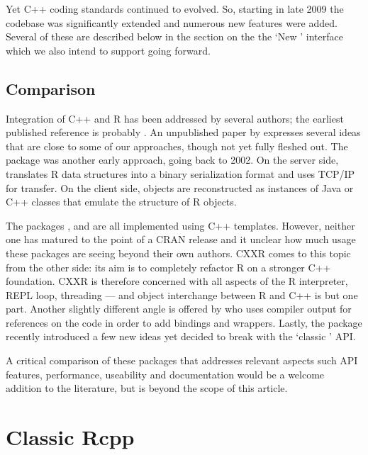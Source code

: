 Yet C++ coding standards continued to evolved. So, starting in late 2009 the
codebase was significantly extended and numerous new features were added.
Several of these are described below in the section on the the `New
' interface which we also intend to support going forward.

\subsection{Comparison}

Integration of C++ and R has been addressed by several authors; the earliest
published reference is probably \cite{batesdebroy01:cppclasses}.
An unpublished paper by \cite{javagailemanly07:r_cpp} expresses several ideas
that are close to some of our approaches, though not yet fully fleshed out.
%
The  package \citep{cran:Rserve} was another early approach,
going back to 2002. On the server side,  translates R data
structures into a binary serialization format and uses TCP/IP for
transfer. On the client side, objects are reconstructed as instances of Java
or C++ classes that emulate the structure of R objects. 

The packages  \citep{liang08:rcppbind}, 
\citep{armstrong09:RAbstraction} and 
\citep{armstrong09:RObjects} are all implemented using C++ templates.
However, neither one has matured to the point of a CRAN release and it
unclear how much usage these packages are seeing beyond their own authors.
%
CXXR \citep{runnalls09:cxxr} comes to this topic from the other side: 
its aim is to completely refactor R on a stronger C++ foundation. 
CXXR is therefore concerned with all aspects of the R interpreter,
REPL loop, threading --- and object interchange between R and C++ is but one part.
%
Another slightly different angle is offered by
\cite{templelang09:rgcctranslationunit} who uses compiler output for
references on the code in order to add bindings and wrappers.
%
Lastly, the  package \citep{samperi09:rcpptemplate}
recently introduced a few new ideas yet decided to break with the
`classic ' API.

A critical comparison of these packages that addresses relevant aspects such
API features, performance, useability and documentation would be a welcome
addition to the literature, but is beyond the scope of this article.

\section{Classic Rcpp}
\label{sec:classic_rcpp}

